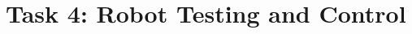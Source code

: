 \documentclass[15pt, a4paper, oneside]{report}
\begin{document}
\normalfont

\vspace*{5mm}

\section*{\Large Task 4: Robot Testing and Control}

\vspace{2mm}
    \Large

    
    
    
    
    
    
    
  
\vspace{1cm}
\end{document}
